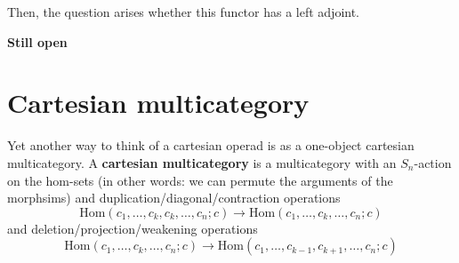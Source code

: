 \documentclass{amsbook}
\theoremstyle{definition}
\begin{document}
  Then, the question arises whether this functor has a left adjoint.

  \textbf{Still open}

  \section{Cartesian multicategory}
  Yet another way to think of a cartesian operad is as a one-object cartesian multicategory. A \textbf{cartesian multicategory} is a multicategory with an $ S_n $-action on the hom-sets (in other words: we can permute the arguments of the morphsims) and duplication/diagonal/contraction operations
  \[ \mathrm{Hom}(c_1, \dots, c_k, c_k, \dots, c_n; c) \to \mathrm{Hom}(c_1, \dots, c_k, \dots, c_n; c) \]
  and deletion/projection/weakening operations
  \[ \mathrm{Hom}(c_1, \dots, c_k, \dots, c_n; c) \to \mathrm{Hom}(c_1, \dots, c_{k-1}, c_{k+1}, \dots, c_n; c) \]
\end{document}
